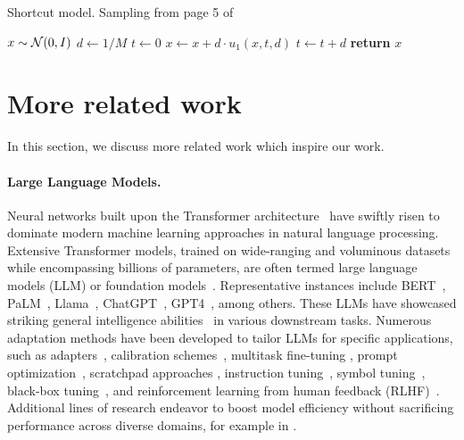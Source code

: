 \begin{algorithm}[!ht]\caption{Shortcut model. Sampling from page 5 of~\cite{fhla24}}
\begin{algorithmic}[1]
\State $x \sim \mathcal{N} (0, I)$
\State $d \gets 1 / M$
\State $t \gets 0$
\State $x \gets x + d \cdot u_1 (x, t, d)$
\State $t \gets t + d$
\EndFor
\State \textbf{return} $x$
\end{algorithmic}
\end{algorithm}


\section{More related work}\label{sec:app:related_work}

In this section, we discuss more related work which inspire our work.
\paragraph{Large Language Models.}Neural networks built upon the Transformer architecture~\cite{vsp+17} have swiftly risen to dominate modern machine learning approaches in natural language processing. Extensive Transformer models, trained on wide-ranging and voluminous datasets while encompassing billions of parameters, are often termed large language models (LLM) or foundation models~\cite{bha+21}. Representative instances include BERT~\cite{dclt19}, PaLM~\cite{cnd+22}, Llama~\cite{tli+23}, ChatGPT~\cite{chatgpt}, GPT4~\cite{o23}, among others. These LLMs have showcased striking general intelligence abilities~\cite{bce+23} in various downstream tasks. Numerous adaptation methods have been developed to tailor LLMs for specific applications, such as adapters~\cite{eyp+22,zhz+23,ghz+23,zjk+23}, calibration schemes~\cite{zwf+21,cpp+23}, multitask fine-tuning \cite{gfc+21a,zzj+23a,vnr+23,zzj+23b}, prompt optimization~\cite{gfc+21b,lac+21}, scratchpad approaches \cite{naa+21}, instruction tuning~\cite{ll21,chl+22,mkd+22}, symbol tuning~\cite{jla+23}, black-box tuning~\cite{ssy+22}, and reinforcement learning from human feedback (RLHF)~\cite{owj+22}. Additional lines of research endeavor to boost model efficiency without sacrificing performance across diverse domains, for example in \cite{dswy22_coreset,swy23,gswy23,gsy23_hyper,gsy23_coin,bsy23,dms23_spar,gms23,ssx23_nns,qss23_gnn,cls+24,lsy24,cll+24_icl,lss+24_multi_layer,cll+24_rope,lsss24_dp_ntk,lss+24_relu,lls+24_prune,llss24_sparsegpt,llsz24_nn_tw,cls24_grams,lls+24_io,cll+24_ssm,chl+24_rope_grad,kll+24_fixed,kll+25,kll+25_tc,lls+25_graph,hwg+24}.











